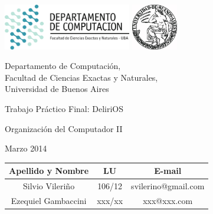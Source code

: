 \documentclass[a4paper,10pt,twoside]{article}
\begin{document}


\thispagestyle{caratula}

\begin{center}

\includegraphics[height=2cm]{DC.png} 
\hfill
\includegraphics[height=2cm]{UBA.jpg} 

\vspace{2cm}

Departamento de Computación,\\
Facultad de Ciencias Exactas y Naturales,\\
Universidad de Buenos Aires

\vspace{4cm}

\begin{Huge}
Trabajo Práctico Final: DeliriOS
\end{Huge}

\vspace{0.5cm}

\begin{Large}
Organización del Computador II
\end{Large}

\vspace{1cm}

Marzo 2014

\vspace{4cm}

\begin{tabular}{|c|c|c|}
    \hline
    Apellido y Nombre & LU & E-mail\\
    \hline
    Silvio Vileriño             & 106/12 & svilerino@gmail.com\\
    Ezequiel Gambaccini 		& xxx/xx & xxx@xxx.com\\
    \hline
\end{tabular}

\vspace{1cm}


\end{center}
\newpage
\end{document}
